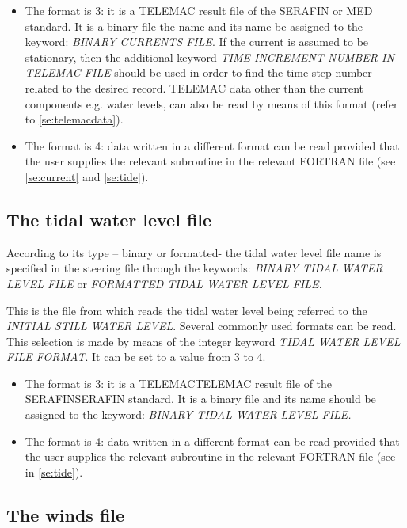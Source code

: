 \begin{itemize}
\item  The format is 3: it is a TELEMAC result file of the SERAFIN or MED standard.
  It is a binary file the name and its name be assigned to the keyword: \textit{BINARY
    CURRENTS FILE}. If the current is assumed to be stationary, then the additional
  keyword \textit{TIME INCREMENT NUMBER IN TELEMAC FILE }should be used in order to
  find the time step number related to the desired record. TELEMAC data other than
  the current components e.g. water levels, can also be read by means of this format
  (refer to \ref{se:telemacdata}).

\item  The format is 4: data written in a different format can be read provided that
  the user supplies the relevant subroutine in the relevant FORTRAN file (see
  \ref{se:current} and \ref{se:tide}).
\end{itemize}


\subsection{ The tidal water level file}
\label{se:tidalfile}
According to its type -- binary or formatted- the tidal water level file name is
specified in the steering file through the keywords: \textit{BINARY TIDAL WATER LEVEL
  FILE }or\textit{ FORMATTED TIDAL WATER LEVEL FILE.}

This is the file from which \tomawac reads the tidal water level being referred to
the \textit{INITIAL STILL WATER LEVEL}. Several commonly used formats can be read.
This selection is made by means of the integer keyword \textit{TIDAL WATER LEVEL FILE
  FORMAT}. It can be set to a value from 3 to 4.

\begin{itemize}
\item  The format is 3: it is a TELEMACTELEMAC result file of the SERAFINSERAFIN
  standard. It is a binary file and its name should be assigned to the keyword:
  \textit{BINARY TIDAL WATER LEVEL FILE.}

\item  The format is 4: data written in a different format can be read provided that
  the user supplies the relevant subroutine in the relevant FORTRAN file (see in
  \ref{se:tide}).
\end{itemize}


\subsection{ The winds file}
\label{se:windfile}

